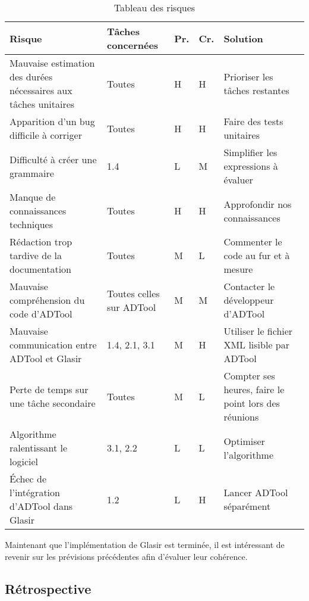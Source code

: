     \begin{table}[H]
        \centering
        \begin{tabular}{|p{4cm}|l|l|l|p{4cm}|}
        	\hline
            \textbf{Risque} & \textbf{Tâches concernées} & \textbf{Pr.} & \textbf{Cr.} & \textbf{Solution}\\
            \hline
            Mauvaise estimation des durées nécessaires aux tâches unitaires & 
                Toutes & H & H &
                Prioriser les tâches restantes\\ 
            \hline
            Apparition d'un bug difficile à corriger & 
                Toutes & H & H &
                Faire des tests unitaires\\
            \hline
            Difficulté à créer une grammaire & 
                1.4 & L & M &
                Simplifier les expressions à évaluer\\ 
            \hline
            Manque de connaissances techniques & 
                Toutes & H & H &
                Approfondir nos connaissances\\ 
            \hline
            Rédaction trop tardive de la documentation & 
                Toutes & M & L &
                Commenter le code au fur et à mesure\\
            \hline
            Mauvaise compréhension du code d'ADTool & 
                Toutes celles sur ADTool & M & M &
                Contacter le développeur d'ADTool\\ 
            \hline
            Mauvaise communication entre ADTool et Glasir & 
                1.4, 2.1, 3.1 & M & H &
                Utiliser le fichier XML lisible par ADTool\\ 
            \hline
            Perte de temps sur une tâche secondaire & 
                Toutes & M & L &
                Compter ses heures, faire le point lors des réunions\\ 
            \hline
            Algorithme ralentissant le logiciel & 
                3.1, 2.2 & L & L &
                Optimiser l’algorithme\\ 
            \hline
            Échec de l'intégration d'ADTool dans Glasir & 
                1.2 & L & H &
                Lancer ADTool séparément\\ 
            \hline
        \end{tabular}
        \caption{Tableau des risques}
        \label{fig:risques}
    \end{table}

Maintenant que l'implémentation de Glasir est terminée, il est intéressant de revenir sur les prévisions précédentes afin d'évaluer leur cohérence. 

\subsection{Rétrospective}
\label{ssec:risquesRetro}